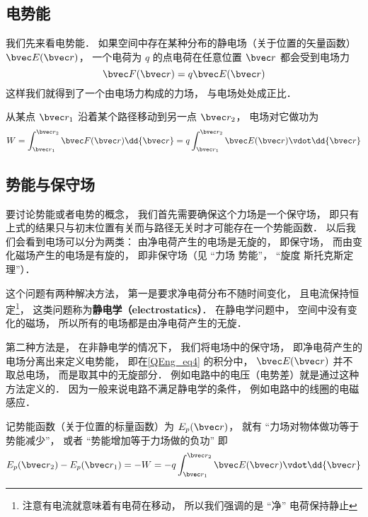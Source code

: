 

\subsection{电势能}
我们先来看电势能． 如果空间中存在某种分布的静电场（关于位置的矢量函数） $\bvec E(\bvec r)$， 一个电荷为 $q$ 的点电荷在任意位置 $\bvec r$ 都会受到电场力
\begin{equation}
\bvec F(\bvec r) = q \bvec E(\bvec r)
\end{equation}
这样我们就得到了一个由电场力构成的力场， 与电场处处成正比． 

从某点 $\bvec r_1$ 沿着某个路径移动到另一点 $\bvec r_2$， 电场对它做功为
\begin{equation}\label{QEng_eq4}
W = \int_{\bvec r_1}^{\bvec r_2} \bvec F(\bvec r) \dd{\bvec r} = q \int_{\bvec r_1}^{\bvec r_2} \bvec E(\bvec r) \vdot \dd{\bvec r}
\end{equation}

\subsection{势能与保守场}
要讨论势能或者电势的概念， 我们首先需要确保这个力场是一个保守场， 即只有上式的结果只与初末位置有关而与路径无关时才可能存在一个势能函数． 以后我们会看到电场可以分为两类： 由净电荷产生的电场是无旋的， 即保守场， 而由变化磁场产生的电场是有旋的， 即非保守场（见 “力场 势能”， “旋度 斯托克斯定理”）．

这个问题有两种解决方法， 第一是要求净电荷分布不随时间变化， 且电流保持恒定\footnote{注意有电流就意味着有电荷在移动， 所以我们强调的是 “净” 电荷保持静止}， 这类问题称为\textbf{静电学（electrostatics）}． 在静电学问题中， 空间中没有变化的磁场， 所以所有的电场都是由净电荷产生的无旋．

第二种方法是， 在非静电学的情况下， 我们将电场中的保守场， 即净电荷产生的电场分离出来定义电势能， 即在\autoref{QEng_eq4} 的积分中， $\bvec E(\bvec r)$ 并不取总电场， 而是取其中的无旋部分． 例如电路中的电压（电势差）就是通过这种方法定义的． 因为一般来说电路不满足静电学的条件， 例如电路中的线圈的电磁感应．

记势能函数（关于位置的标量函数）为 $E_p(\bvec r)$， 就有 “力场对物体做功等于势能减少”， 或者 “势能增加等于力场做的负功” 即
\begin{equation}\label{QEng_eq5}
E_p(\bvec r_2) - E_p(\bvec r_1) = -W = -q \int_{\bvec r_1}^{\bvec r_2} \bvec E(\bvec r) \vdot \dd{\bvec r}
\end{equation}

